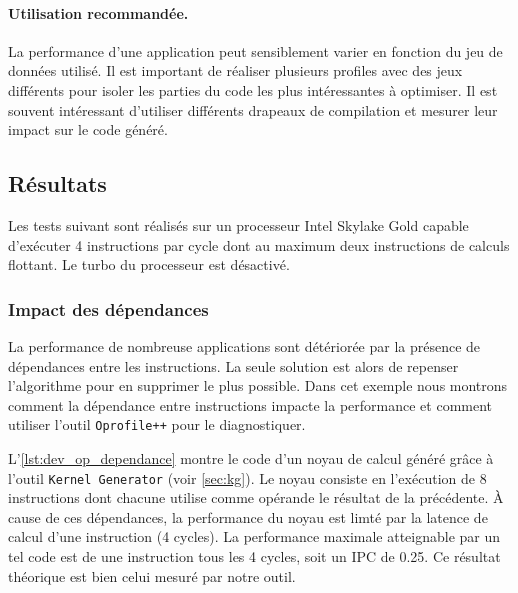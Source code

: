         \paragraph{Utilisation recommandée.} La performance d'une application peut sensiblement varier en fonction du jeu de données utilisé. Il est important de réaliser plusieurs profiles avec des jeux différents pour isoler les parties du code les plus intéressantes à optimiser. Il est souvent intéressant d'utiliser différents drapeaux de compilation et mesurer leur impact sur le code généré. 
        

\subsection{Résultats}

    Les tests suivant sont réalisés sur un processeur Intel Skylake Gold capable d'exécuter 4 instructions par cycle dont au maximum deux instructions de calculs flottant. Le turbo du processeur est désactivé. 


    \subsubsection{Impact des dépendances}
        La performance de nombreuse applications sont détériorée par la présence de dépendances entre les instructions. La seule solution est alors de repenser l'algorithme pour en supprimer le plus possible. Dans cet exemple nous montrons comment la dépendance entre instructions impacte la performance et comment utiliser l'outil \verb=Oprofile++= pour le diagnostiquer. 
        
        L'\autoref{lst:dev_op_dependance} montre le code d'un noyau de calcul généré grâce à l'outil \verb|Kernel Generator| (voir \autoref{sec:kg}). Le noyau consiste en l'exécution de 8 instructions dont chacune utilise comme opérande le résultat de la précédente. À cause de ces dépendances, la performance du noyau est limté par la latence de calcul d'une instruction (4 cycles). La performance maximale atteignable par un tel code est de une instruction tous les 4 cycles, soit un IPC de 0.25. Ce résultat théorique est bien celui mesuré par notre outil. 
        
